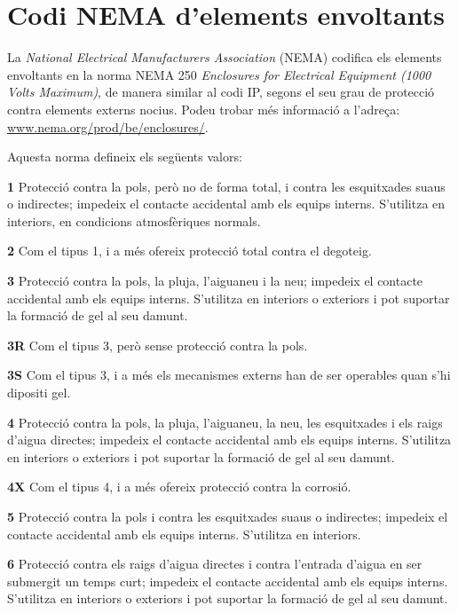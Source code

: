 \section{Codi NEMA d'elements envoltants}
 

La \textit{National Electrical Manufacturers Association} (NEMA)
codifica els elements envoltants en la norma NEMA 250 \textit{Enclosures for Electrical Equipment (1000 Volts Maximum)}, de manera similar al codi IP, segons el seu grau de protecció contra elements externs nocius. Podeu trobar més informació a l'adreça: \href{http://www.nema.org/prod/be/enclosures/}{www.nema.org/prod/be/enclosures/}.

Aquesta norma defineix els següents valors:

\begin{list}{}
   {\setlength{\labelwidth}{10mm} \setlength{\leftmargin}{10mm} \setlength{\labelsep}{2mm}}
   \item[\textbf{1}] Protecció contra la pols, però no de forma total, i contra les esquitxades suaus o indirectes; impedeix el contacte accidental amb els equips interns. S'utilitza en interiors, en condicions atmosfèriques normals.
   \item[\textbf{2}] Com el tipus 1, i a més ofereix protecció total contra el degoteig.
   \item[\textbf{3}] Protecció contra la pols, la pluja, l'aiguaneu i la neu; impedeix el contacte accidental amb els equips interns. S'utilitza en interiors o exteriors i pot suportar la formació de gel al seu damunt.
   \item[\textbf{3R}] Com el tipus 3, però sense protecció contra la pols.
   \item[\textbf{3S}] Com el tipus 3, i a més els mecanismes externs han de ser operables quan s'hi dipositi gel.
    \item[\textbf{4}] Protecció contra la pols, la pluja, l'aiguaneu, la neu, les esquitxades i els raigs d'aigua directes; impedeix el contacte accidental amb els equips interns. S'utilitza en interiors o exteriors i pot suportar la formació de gel al seu damunt.
   \item[\textbf{4X}] Com el tipus 4, i a més ofereix protecció contra la corrosió.
   \item[\textbf{5}] Protecció contra la pols i contra les esquitxades suaus o indirectes; impedeix el contacte accidental amb els equips interns. S'utilitza en interiors.
   \item[\textbf{6}] Protecció contra els raigs d'aigua directes i contra l'entrada d'aigua en ser submergit un temps curt; impedeix el contacte accidental amb els equips interns. S'utilitza en interiors o exteriors i pot suportar la formació de gel al seu damunt.

\end{list}
